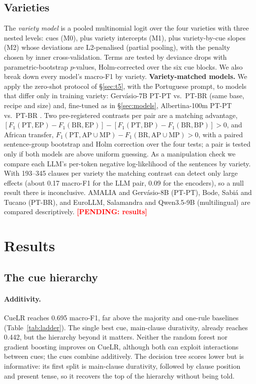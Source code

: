 \documentclass[11pt]{article}
\newcommand{\pending}[1]{\textcolor{red}{\textbf{[PENDING: #1]}}}
\begin{document}
\subsection{Varieties}
\label{sec:var-method}
The \emph{variety model} is a pooled multinomial logit over the four varieties with three nested levels: cues (M0), plus variety intercepts (M1), plus variety-by-cue slopes (M2) whose deviations are L2-penalised (partial pooling), with the penalty chosen by inner cross-validation. Terms are tested by deviance drops with parametric-bootstrap $p$-values, Holm-corrected over the six cue blocks. We also break down every model's macro-F1 by variety. \textbf{Variety-matched models.} We apply the zero-shot protocol of \S\ref{sec:t5}, with the Portuguese prompt, to models that differ only in training variety: Gervásio-7B PT-PT vs.\ PT-BR \citep{santos2024gervasio} (same base, recipe and size) and, fine-tuned as in \S\ref{sec:models}, Albertina-100m PT-PT vs.\ PT-BR \citep{rodrigues2023albertina}. Two pre-registered contrasts per pair are a matching advantage, $[F_1(\text{PT},\text{EP})-F_1(\text{BR},\text{EP})]-[F_1(\text{PT},\text{BP})-F_1(\text{BR},\text{BP})]>0$, and African transfer, $F_1(\text{PT},\text{AP}{\cup}\text{MP})-F_1(\text{BR},\text{AP}{\cup}\text{MP})>0$, with a paired sentence-group bootstrap and Holm correction over the four tests; a pair is tested only if both models are above uniform guessing. As a manipulation check we compare each LLM's per-token negative log-likelihood of the sentences by variety. With 193--345 clauses per variety the matching contrast can detect only large effects (about 0.17 macro-F1 for the LLM pair, 0.09 for the encoders), so a null result there is inconclusive. AMALIA and Gervásio-8B (PT-PT), Bode, Sabiá and Tucano (PT-BR), and EuroLLM, Salamandra and Qwen3.5-9B (multilingual) are compared descriptively. \pending{results}

\section{Results}
\label{sec:results}

\subsection{The cue hierarchy}
\label{sec:hierarchy}
\paragraph{Additivity.} CueLR reaches 0.695 macro-F1, far above the majority and one-rule baselines (Table~\ref{tab:ladder}). The single best cue, main-clause durativity, already reaches 0.442, but the hierarchy beyond it matters. Neither the random forest nor gradient boosting improves on CueLR, although both can exploit interactions between cues; the cues combine additively. The decision tree scores lower but is informative: its first split is main-clause durativity, followed by clause position and present tense, so it recovers the top of the hierarchy without being told.
\end{document}
